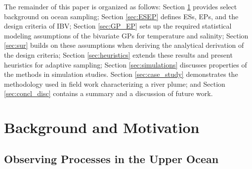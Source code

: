 \documentclass[aoas]{imsart}
\begin{document}
The remainder of this paper is organized as follows: Section
\ref{sec:bg} provides select background on ocean sampling; Section
\ref{sec:ESEP} defines ESs, EPs, and the design criteria of IBV;
Section \ref{sec:GP_EP} sets up the required statistical modeling
assumptions of the bivariate GPs for temperature and salinity;
Section \ref{sec:sur} builds on these assumptions when deriving the
analytical derivation of the design criteria; Section
\ref{sec:heuristics} extends these results and present heuristics for
adaptive sampling; Section \ref{sec:simulations}
discusses properties of the methods in simulation studies. Section
\ref{sec:case_study} demonstrates the methodology used in field work
characterizing a river plume; and Section \ref{sec:concl_disc}
contains a summary and a discussion of future work.


\section{Background and Motivation}\label{sec:bg}


\subsection{Observing Processes in the Upper Ocean}


\end{document}
